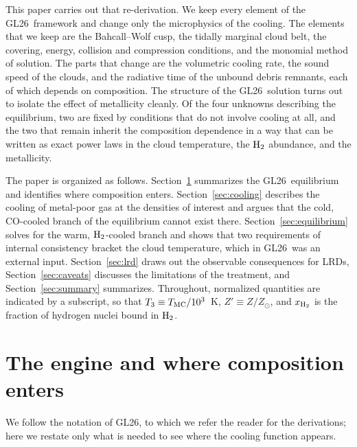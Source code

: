 \documentclass[twocolumn,pdftex]{aastex701}
\newcommand{\Tthree}{T_{3}}
\newcommand{\xhh}{x_{\rm H_2}}
\newcommand{\Zp}{Z'}
\newcommand{\GL}{GL26}
\newcommand{\Htwo}{{\rm H_2}}
\begin{document}
This paper carries out that re-derivation. We keep every element of the \GL\ framework and change only the microphysics of the cooling. The elements that we keep are the Bahcall--Wolf cusp, the tidally marginal cloud belt, the covering, energy, collision and compression conditions, and the monomial method of solution. The parts that change are the volumetric cooling rate, the sound speed of the clouds, and the radiative time of the unbound debris remnants, each of which depends on composition. The structure of the \GL\ solution turns out to isolate the effect of metallicity cleanly. Of the four unknowns describing the equilibrium, two are fixed by conditions that do not involve cooling at all, and the two that remain inherit the composition dependence in a way that can be written as exact power laws in the cloud temperature, the $\Htwo$ abundance, and the metallicity.

The paper is organized as follows. Section~\ref{sec:engine} summarizes the \GL\ equilibrium and identifies where composition enters. Section~\ref{sec:cooling} describes the cooling of metal-poor gas at the densities of interest and argues that the cold, CO-cooled branch of the equilibrium cannot exist there. Section~\ref{sec:equilibrium} solves for the warm, $\Htwo$-cooled branch and shows that two requirements of internal consistency bracket the cloud temperature, which in \GL\ was an external input. Section~\ref{sec:lrd} draws out the observable consequences for LRDs, Section~\ref{sec:caveats} discusses the limitations of the treatment, and Section~\ref{sec:summary} summarizes. Throughout, normalized quantities are indicated by a subscript, so that $\Tthree \equiv T_{\rm MC}/10^{3}$~K, $\Zp \equiv Z/Z_\odot$, and $\xhh$ is the fraction of hydrogen nuclei bound in $\Htwo$.

\section{The engine and where composition enters}\label{sec:engine}

We follow the notation of \GL, to which we refer the reader for the derivations; here we restate only what is needed to see where the cooling function appears.
\end{document}
